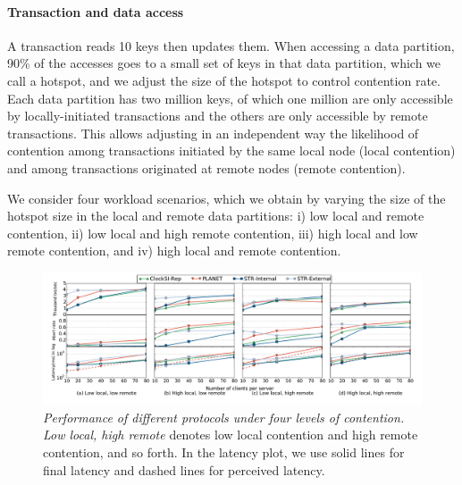 \paragraph{Transaction and data access} A transaction reads 10 keys then updates them. When accessing a data partition, 90\% of the accesses goes to a small set of keys in that data partition, which we call a hotspot, and we adjust the size of the hotspot to control contention rate. Each data partition has two million keys, of which one million are only accessible by locally-initiated transactions and the others are only accessible by remote transactions. This allows adjusting in an independent way  the likelihood of contention among transactions initiated by the same local node (local contention) and among transactions originated at remote nodes (remote contention).

We consider four workload scenarios, which we obtain by varying the size of the hotspot size in the local and remote data partitions: i) low local and remote contention, ii) low local  and high remote contention, iii) high local and low remote contention, and iv) high local and remote contention.%



\begin{figure}
\centering
\def\svgwidth{0.98\columnwidth}
\includegraphics[scale=0.32]{figures/micro}
\vspace{-6mm}
\caption{\small \textit{Performance of different protocols under four levels of contention.} \textit{Low local, high remote} denotes low local contention and high remote contention, and so forth. In the latency plot, we use solid lines for final latency and dashed lines for  perceived latency.}
\label{fig:micro}
\end{figure}


